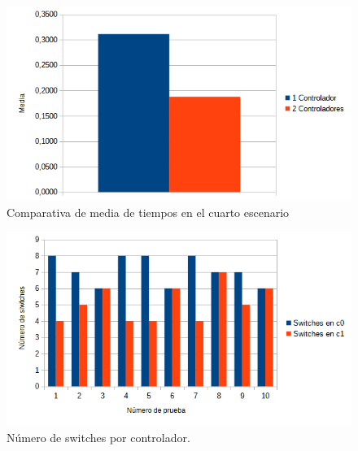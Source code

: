 \documentclass[a4paper, 12pt]{book}
\begin{document}
	\begin{figure}[H]
		\centering
		\includegraphics[width=13cm, keepaspectratio]{img/comparativamediaescenario4}
		\caption{Comparativa de media de tiempos en el cuarto escenario}
		\label{figura:mediaescenario4}
	\end{figure}
	

	

	
%	
		
	\begin{figure}[H]
		\centering
		\includegraphics[width=16cm, keepaspectratio]{img/switchesporcontrollerescenario3}
		\caption{Número de switches por controlador.}
		\label{figura:switchesporcontrollerescenario4}
	\end{figure}
	
\end{document}
